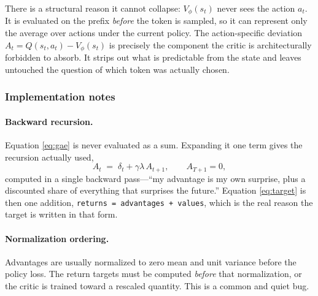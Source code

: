 There is a structural reason it cannot collapse: $V_{\phi}(s_t)$ never sees the action
$a_t$. It is evaluated on the prefix \emph{before} the token is sampled, so it can
represent only the average over actions under the current policy. The
action-specific deviation $A_t = Q(s_t,a_t) - V_{\phi}(s_t)$ is precisely the component
the critic is architecturally forbidden to absorb. It strips out what is
predictable from the state and leaves untouched the question of which token was
actually chosen.
 


\subsubsection{Implementation notes}

   
\paragraph{Backward recursion.} Equation \eqref{eq:gae} is never evaluated as a
sum. Expanding it one term gives the recursion actually used,
%
\begin{equation}
  A_t \;=\; \delta_t + \gamma\lambda\,A_{t+1}, \qquad A_{T+1} = 0,
\end{equation}
%
computed in a single backward pass---``my advantage is my own surprise, plus a
discounted share of everything that surprises the future.'' Equation
\eqref{eq:target} is then one addition, \texttt{returns = advantages + values},
which is the real reason the target is written in that form.
  
\paragraph{Normalization ordering.} Advantages are usually normalized to zero mean
and unit variance before the policy loss. The return targets must be computed
\emph{before} that normalization, or the critic is trained toward a rescaled
quantity. This is a common and quiet bug.
  
